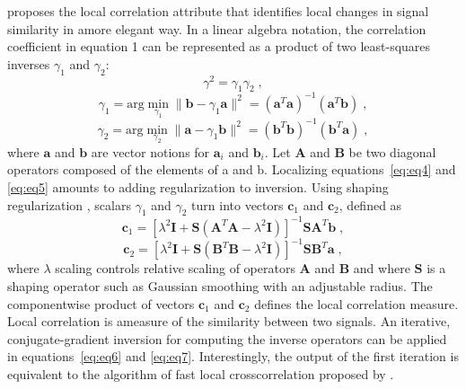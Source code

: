 \cite{Fomel07b} proposes the local correlation attribute that identifies
local changes in signal similarity in amore elegant way. In a linear
algebra notation, the correlation coefficient in equation 1 can be
represented as a product of two least-squares inverses $\gamma_1$ and $\gamma_2$:
      \begin{equation}
          \gamma^2 = \gamma_1 \gamma_2\;,
        \label{eq:eq3}
      \end{equation}
      \begin{equation}
          \gamma_1 = \textrm{arg} \min_{\gamma_1}\parallel \mathbf{b}-\gamma_1 \mathbf{a} \parallel^2 = (\mathbf{a}^T\mathbf{a})^{-1}(\mathbf{a}^T\mathbf{b})\;,
        \label{eq:eq4}
      \end{equation}
      \begin{equation}
        \label{eq:eq5}
          \gamma_2 = \textrm{arg} \min_{\gamma_2}\parallel \mathbf{a}-\gamma_1 \mathbf{b} \parallel^2 = (\mathbf{b}^T\mathbf{b})^{-1}(\mathbf{b}^T\mathbf{a})\;,
      \end{equation}
where $\mathbf{a}$ and $\mathbf{b}$ are vector notions for $\mathbf{a}_i$ and 
$\mathbf{b}_i$. Let $\mathbf{A}$ and $\mathbf{B}$ be two diagonal
operators composed of the elements of a and b. Localizing
equations~\ref{eq:eq4} and \ref{eq:eq5} amounts to adding regularization to 
inversion. Using shaping regularization \cite[]{Fomel07a}, scalars $\gamma_1$ 
and $\gamma_2$ turn into vectors $\mathbf{c}_1$ and $\mathbf{c}_2$, defined as
      \begin{equation}
          \mathbf{c}_1 = [\lambda^2 \mathbf{I} + \mathbf{S}(\mathbf{A}^T \mathbf{A} - \lambda^2 \mathbf{I})]^{-1}\mathbf{S}\mathbf{A}^T\mathbf{b}\;,
        \label{eq:eq6}
      \end{equation}
      \begin{equation}
          \mathbf{c}_2 = [\lambda^2 \mathbf{I} + \mathbf{S}(\mathbf{B}^T \mathbf{B} - \lambda^2 \mathbf{I})]^{-1}\mathbf{S}\mathbf{B}^T\mathbf{a}\;,
        \label{eq:eq7}
      \end{equation}
where $\lambda$ scaling controls relative scaling of operators $\mathbf{A}$ 
and $\mathbf{B}$ and
where $\mathbf{S}$ is a shaping operator such as Gaussian smoothing with an
adjustable radius. The componentwise product of vectors $\mathbf{c}_1$ and 
$\mathbf{c}_2$
defines the local correlation measure. Local correlation is ameasure
of the similarity between two signals.
An iterative, conjugate-gradient inversion for computing the inverse
operators can be applied in equations~\ref{eq:eq6} and \ref{eq:eq7}. 
Interestingly, the output of the first iteration is equivalent to the 
algorithm of fast local
crosscorrelation proposed by \cite{Hale06}.

